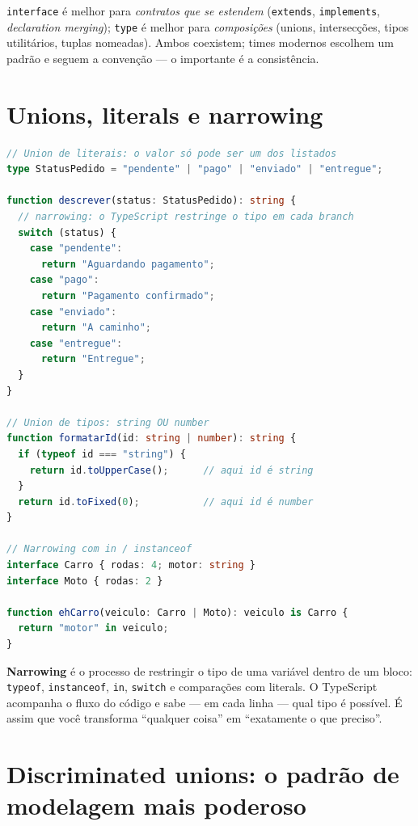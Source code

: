 \begin{caixaconceito}
\texttt{interface} é melhor para \emph{contratos que se estendem}
(\texttt{extends}, \texttt{implements}, \emph{declaration merging}); \texttt{type}
é melhor para \emph{composições} (unions, intersecções, tipos utilitários,
tuplas nomeadas). Ambos coexistem; times modernos escolhem um padrão e seguem
a convenção — o importante é a consistência.
\end{caixaconceito}

\section{Unions, literals e narrowing}

\begin{lstlisting}[style=livro, language=TypeScript,
  caption={Unions, literals e narrowing com segurança.}, label={list:ts-union}]
// Union de literais: o valor só pode ser um dos listados
type StatusPedido = "pendente" | "pago" | "enviado" | "entregue";

function descrever(status: StatusPedido): string {
  // narrowing: o TypeScript restringe o tipo em cada branch
  switch (status) {
    case "pendente":
      return "Aguardando pagamento";
    case "pago":
      return "Pagamento confirmado";
    case "enviado":
      return "A caminho";
    case "entregue":
      return "Entregue";
  }
}

// Union de tipos: string OU number
function formatarId(id: string | number): string {
  if (typeof id === "string") {
    return id.toUpperCase();      // aqui id é string
  }
  return id.toFixed(0);           // aqui id é number
}

// Narrowing com in / instanceof
interface Carro { rodas: 4; motor: string }
interface Moto { rodas: 2 }

function ehCarro(veiculo: Carro | Moto): veiculo is Carro {
  return "motor" in veiculo;
}
\end{lstlisting}

\begin{caixaconceito}
\textbf{Narrowing} é o processo de restringir o tipo de uma variável dentro de
um bloco: \texttt{typeof}, \texttt{instanceof}, \texttt{in}, \texttt{switch}
e comparações com literals. O TypeScript acompanha o fluxo do código e sabe —
em cada linha — qual tipo é possível. É assim que você transforma ``qualquer
coisa'' em ``exatamente o que preciso''.
\end{caixaconceito}

\section{Discriminated unions: o padrão de modelagem mais poderoso}

